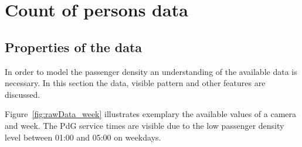 \section{Count of persons data}

\subsection{Properties of the data}
\label{sec:PassengerDensityData}

In order to model the passenger density an understanding of the available data is necessary. In this section the data, visible pattern and other features are discussed.

Figure~\ref{fig:rawData_week} illustrates exemplary the available values of a camera and week. The PdG service times are visible due to the low passenger density level between 01:00 and 05:00 on weekdays.

